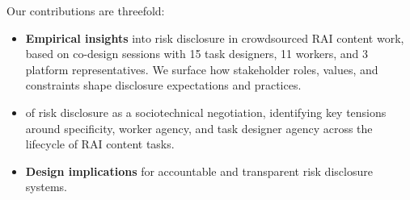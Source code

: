 Our contributions are threefold:
\begin{itemize}
\item \textbf{Empirical insights} into risk disclosure in crowdsourced RAI content work, based on  co-design sessions with 15 task designers, 11 workers, and 3 platform representatives. We surface how stakeholder roles, values, and constraints shape disclosure expectations and practices.
\item \textbf{} of risk disclosure as a sociotechnical negotiation, identifying key tensions around specificity, worker agency, and task designer agency across the lifecycle of RAI content tasks. 
\item \textbf{Design implications}  for accountable and transparent risk disclosure systems.

\end{itemize}
